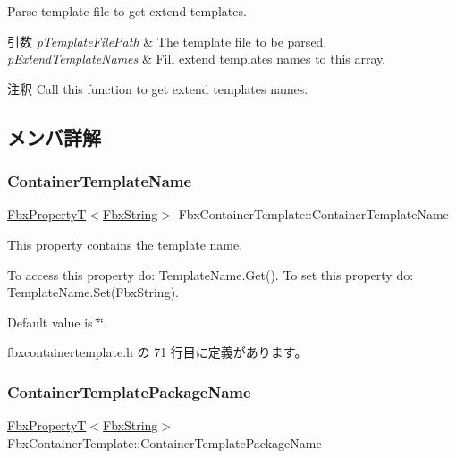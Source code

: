 Parse template file to get extend templates. 
\begin{DoxyParams}{引数}
{\em p\+Template\+File\+Path} & The template file to be parsed. \\
\hline
{\em p\+Extend\+Template\+Names} & Fill extend templates\textquotesingle{} names to this array. \\
\hline
\end{DoxyParams}
\begin{DoxyRemark}{注釈}
Call this function to get extend templates\textquotesingle{} names. 
\end{DoxyRemark}


\subsection{メンバ詳解}
\mbox{\label{class_fbx_container_template_ae30cc6c47849ef02f82707c8691df636}} 
\subsubsection{\texorpdfstring{Container\+Template\+Name}{ContainerTemplateName}}
{\footnotesize\ttfamily \hyperlink{class_fbx_property_t}{Fbx\+PropertyT}$<$\hyperlink{class_fbx_string}{Fbx\+String}$>$ Fbx\+Container\+Template\+::\+Container\+Template\+Name}

This property contains the template name.

To access this property do\+: Template\+Name.\+Get(). To set this property do\+: Template\+Name.\+Set(\+Fbx\+String).

Default value is \char`\"{}\char`\"{}. 

 fbxcontainertemplate.\+h の 71 行目に定義があります。

\mbox{\label{class_fbx_container_template_a6f0973e4624ac59f1c0af9e172f224c1}} 
\subsubsection{\texorpdfstring{Container\+Template\+Package\+Name}{ContainerTemplatePackageName}}
{\footnotesize\ttfamily \hyperlink{class_fbx_property_t}{Fbx\+PropertyT}$<$\hyperlink{class_fbx_string}{Fbx\+String}$>$ Fbx\+Container\+Template\+::\+Container\+Template\+Package\+Name}

